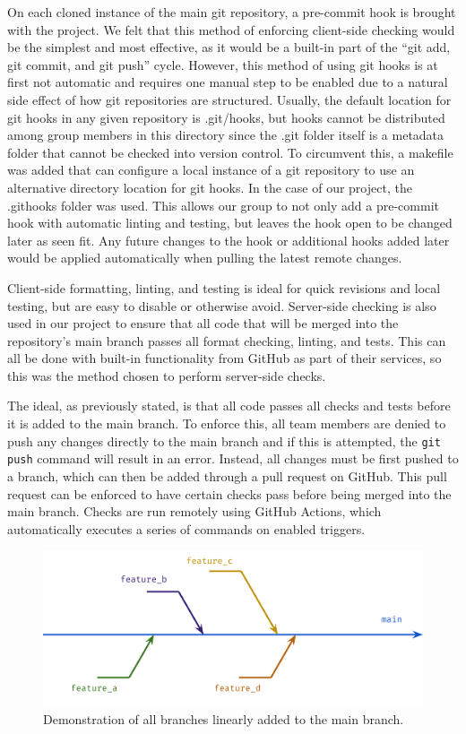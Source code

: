 \documentclass[
    paper=letter,
    parskip=half,
    fontsize=12pt,
    titlepage=firstiscover,
    toc=bibliography,
    numbers=endperiod
]{scrartcl}
\begin{document}
On each cloned instance of the main git repository, a pre-commit hook is
brought with the project. We felt that this method of enforcing
client-side checking would be the simplest and most effective, as it
would be a built-in part of the ``git add, git commit, and git push''
cycle. However, this method of using git hooks is at first not automatic
and requires one manual step to be enabled due to a natural side effect
of how git repositories are structured. Usually, the default location
for git hooks in any given repository is .git/hooks, but hooks cannot be
distributed among group members in this directory since the .git folder
itself is a metadata folder that cannot be checked into version control.
To circumvent this, a makefile was added that can configure a local
instance of a git repository to use an alternative directory location
for git hooks. In the case of our project, the .githooks folder was
used. This allows our group to not only add a pre-commit hook with
automatic linting and testing, but leaves the hook open to be changed
later as seen fit. Any future changes to the hook or additional hooks
added later would be applied automatically when pulling the latest
remote changes.

Client-side formatting, linting, and testing is ideal for quick
revisions and local testing, but are easy to disable or otherwise avoid.
Server-side checking is also used in our project to ensure that all code
that will be merged into the repository's main branch passes all format
checking, linting, and tests. This can all be done with built-in
functionality from GitHub as part of their services, so this was the
method chosen to perform server-side checks.

The ideal, as previously stated, is that all code passes all checks and
tests before it is added to the main branch. To enforce this, all team
members are denied to push any changes directly to the main branch and
if this is attempted, the \texttt{git push} command will result in an
error. Instead, all changes must be first pushed to a branch, which can
then be added through a pull request on GitHub. This pull request can be
enforced to have certain checks pass before being merged into the main
branch. Checks are run remotely using GitHub Actions, which
automatically executes a series of commands on enabled triggers.

\begin{figure}[H]
    \includegraphics[width=12cm]{git-branching}
    \caption{Demonstration of all branches linearly added to the main branch.}
\end{figure}
\end{document}

